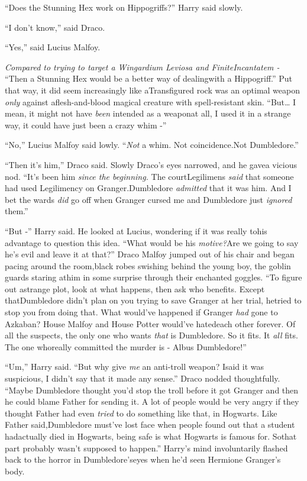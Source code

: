 ``Does the Stunning Hex work on Hippogriffs?'' Harry said slowly.

``I don't know,'' said Draco.

``Yes,'' said Lucius Malfoy.

\emph{Compared to trying to target a Wingardium Leviosa and FiniteIncantatem -} ``Then a Stunning Hex would be a better way of dealingwith a Hippogriff.'' Put that way, it did seem increasingly like aTransfigured rock was an optimal weapon \emph{only} against aflesh-and-blood magical creature with spell-resistant skin.
``But\ldots{} I mean, it might not have \emph{been} intended as a weaponat all, I used it in a strange way, it could have just been a crazy whim
-''

``No,'' Lucius Malfoy said lowly. ``\emph{Not} a whim. Not coincidence.Not Dumbledore.''

``Then it's him,'' Draco said. Slowly Draco's eyes narrowed, and he gavea vicious nod. ``It's been him \emph{since the beginning.} The courtLegilimens \emph{said} that someone had used Legilimency on Granger.Dumbledore \emph{admitted} that it was him. And I bet the wards
\emph{did} go off when Granger cursed me and Dumbledore just
\emph{ignored} them.''

``But -'' Harry said. He looked at Lucius, wondering if it was really tohis advantage to question this idea. ``What would be his \emph{motive?}Are we going to say he's evil and leave it at that?'' Draco Malfoy jumped out of his chair and began pacing around the room,black robes swishing behind the young boy, the goblin guards staring athim in some surprise through their enchanted goggles. ``To figure out astrange plot, look at what happens, then ask who benefits. Except thatDumbledore didn't plan on you trying to save Granger at her trial, hetried to stop you from doing that. What would've happened if Granger \emph{had} gone to Azkaban? House Malfoy and House Potter would've hatedeach other forever. Of all the suspects, the only one who wants \emph{that} is Dumbledore. So it fits. It \emph{all} fits. The one whoreally committed the murder is - Albus Dumbledore!''

``Um,'' Harry said. ``But why give \emph{me} an anti-troll weapon? Isaid it was suspicious, I didn't say that it made any sense.''
Draco nodded thoughtfully. ``Maybe Dumbledore thought you'd stop the troll before it got Granger and then he could blame Father for sending it. A lot of people would be very angry if they thought Father had even \emph{tried} to do something like that, in Hogwarts. Like Father said,Dumbledore must've lost face when people found out that a student hadactually died in Hogwarts, being safe is what Hogwarts is famous for. Sothat part probably wasn't supposed to happen.''
Harry's mind involuntarily flashed back to the horror in Dumbledore'seyes when he'd seen Hermione Granger's body.

